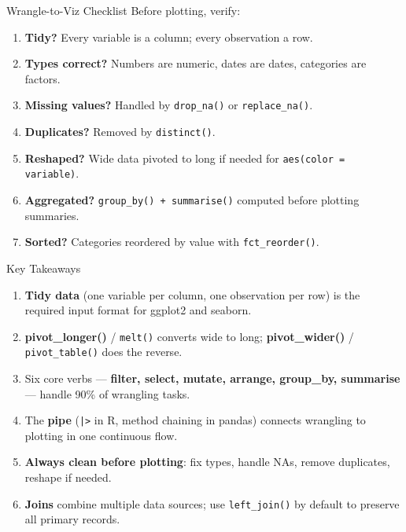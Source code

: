 \documentclass[10pt]{beamer}
\begin{document}
\begin{frame}{Wrangle-to-Viz Checklist}
  Before plotting, verify:
  \begin{enumerate}
    \item \textbf{Tidy?} Every variable is a column; every observation a row.
    \item \textbf{Types correct?} Numbers are numeric, dates are dates,
          categories are factors.
    \item \textbf{Missing values?} Handled by \texttt{drop\_na()} or
          \texttt{replace\_na()}.
    \item \textbf{Duplicates?} Removed by \texttt{distinct()}.
    \item \textbf{Reshaped?} Wide data pivoted to long if needed for
          \texttt{aes(color = variable)}.
    \item \textbf{Aggregated?} \texttt{group\_by() + summarise()} computed
          before plotting summaries.
    \item \textbf{Sorted?} Categories reordered by value with
          \texttt{fct\_reorder()}.
  \end{enumerate}
\end{frame}

\begin{frame}{Key Takeaways}
  \begin{enumerate}
    \item \textbf{Tidy data} (one variable per column, one observation per
          row) is the required input format for ggplot2 and seaborn.
    \item \textbf{pivot\_longer()} / \texttt{melt()} converts wide to long;
          \textbf{pivot\_wider()} / \texttt{pivot\_table()} does the reverse.
    \item Six core verbs --- \textbf{filter, select, mutate, arrange,
          group\_by, summarise} --- handle 90\% of wrangling tasks.
    \item The \textbf{pipe} (\texttt{|>} in R, method chaining in pandas)
          connects wrangling to plotting in one continuous flow.
    \item \textbf{Always clean before plotting}: fix types, handle NAs,
          remove duplicates, reshape if needed.
    \item \textbf{Joins} combine multiple data sources; use
          \texttt{left\_join()} by default to preserve all primary records.
  \end{enumerate}
\end{frame}
\end{document}

